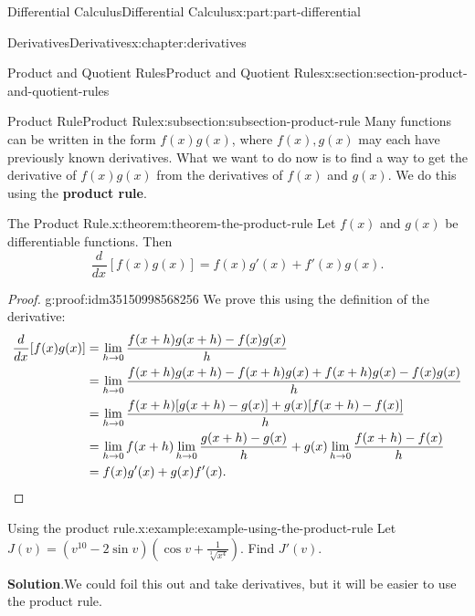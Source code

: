 \documentclass[twoside,10pt,]{tufte-book}
\newcommand{\blocktitlefont}{\relax}
\newcommand{\terminology}[1]{\textbf{#1}}
\numberwithin{equation}{part}
\newcommand{\qedhere}{\relax}
\newcommand{\dv}[3][]{\dfrac{d^{#1} #2}{d #3^{#1}}}
\begin{document}
\begin{partptx}{Differential Calculus}{}{Differential Calculus}{}{}{x:part:part-differential}
\begin{chapterptx}{Derivatives}{}{Derivatives}{}{}{x:chapter:derivatives}
\typeout{************************************************}
%
\begin{sectionptx}{Product and Quotient Rules}{}{Product and Quotient Rules}{}{}{x:section:section-product-and-quotient-rules}
%
%
\typeout{************************************************}
\typeout{************************************************}
%
\begin{subsectionptx}{Product Rule}{}{Product Rule}{}{}{x:subsection:subsection-product-rule}
Many functions can be written in the form \(f(x)g(x)\), where \(f(x),g(x)\) may each have previously known derivatives. What we want to do now is to find a way to get the derivative of \(f(x)g(x)\) from the derivatives of \(f(x)\) and \(g(x)\). We do this using the \terminology{product rule}.%
\begin{theorem}{The Product Rule.}{}{x:theorem:theorem-the-product-rule}%
%
Let \(f(x)\) and \(g(x)\) be differentiable functions. Then%
\begin{equation*}
\dv{}{x}[f(x)g(x)] = f(x)g'(x) + f'(x)g(x).
\end{equation*}
%
\end{theorem}
\begin{proof}{}{g:proof:idm35150998568256}
We prove this using the definition of the derivative:%
\begin{align*}
\dv{}{x}[f(x)g(x)] & = \lim_{h\to0}\frac{f(x+h)g(x+h) - f(x)g(x)}{h} \\
& = \lim_{h\to0}\frac{f(x+h)g(x+h) - f(x+h)g(x) + f(x+h)g(x) - f(x)g(x)}{h} \\
& = \lim_{h\to0}\frac{f(x+h)[g(x+h) - g(x)] + g(x)[f(x+h) - f(x)]}{h} \\
& = \lim_{h\to0}f(x+h)\lim_{h\to0}\frac{g(x+h) - g(x)}{h} + g(x)\lim_{h\to0}\frac{f(x+h) - f(x)}{h} \\
& = f(x)g'(x) + g(x)f'(x). \qedhere
\end{align*}
%
\end{proof}
\begin{example}{Using the product rule.}{x:example:example-using-the-product-rule}%
Let \(J(v) = (v^{10} - 2\sin v)(\cos v + \frac{1}{\sqrt[3]{x^{4}}})\). Find \(J'(v)\).%
\par\smallskip%
\noindent\textbf{\blocktitlefont Solution}.\hypertarget{g:solution:idm35150998564544}{}\quad{}We could foil this out and take derivatives, but it will be easier to use the product rule.%
\end{example}

\end{subsectionptx}
\end{sectionptx}
\end{chapterptx}
\end{partptx}
\end{document}
